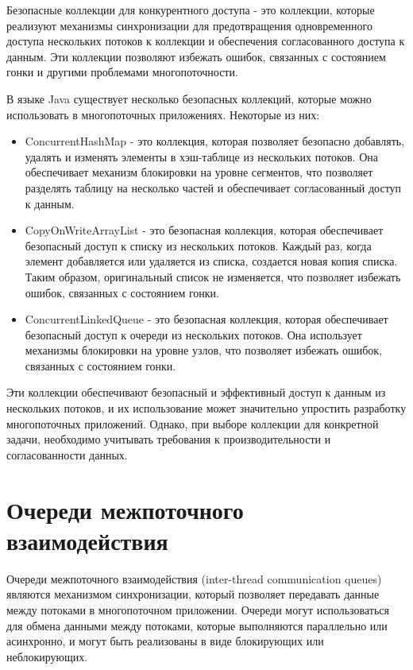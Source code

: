 Безопасные коллекции для конкурентного доступа - это коллекции, которые реализуют механизмы синхронизации для предотвращения одновременного доступа нескольких потоков к коллекции и обеспечения согласованного доступа к данным. Эти коллекции позволяют избежать ошибок, связанных с состоянием гонки и другими проблемами многопоточности.

В языке Java существует несколько безопасных коллекций, которые можно использовать в многопоточных приложениях. Некоторые из них:

\begin{itemize}
\item ConcurrentHashMap - это коллекция, которая позволяет безопасно добавлять, удалять и изменять элементы в хэш-таблице из нескольких потоков. Она обеспечивает механизм блокировки на уровне сегментов, что позволяет разделять таблицу на несколько частей и обеспечивает согласованный доступ к данным.
\item CopyOnWriteArrayList - это безопасная коллекция, которая обеспечивает безопасный доступ к списку из нескольких потоков. Каждый раз, когда элемент добавляется или удаляется из списка, создается новая копия списка. Таким образом, оригинальный список не изменяется, что позволяет избежать ошибок, связанных с состоянием гонки.
\item ConcurrentLinkedQueue - это безопасная коллекция, которая обеспечивает безопасный доступ к очереди из нескольких потоков. Она использует механизмы блокировки на уровне узлов, что позволяет избежать ошибок, связанных с состоянием гонки.
\end{itemize}

Эти коллекции обеспечивают безопасный и эффективный доступ к данным из нескольких потоков, и их использование может значительно упростить разработку многопоточных приложений. Однако, при выборе коллекции для конкретной задачи, необходимо учитывать требования к производительности и согласованности данных.

\section{Очереди межпоточного взаимодействия}

Очереди межпоточного взаимодействия (inter-thread communication queues) являются механизмом синхронизации, который позволяет передавать данные между потоками в многопоточном приложении. Очереди могут использоваться для обмена данными между потоками, которые выполняются параллельно или асинхронно, и могут быть реализованы в виде блокирующих или неблокирующих.

